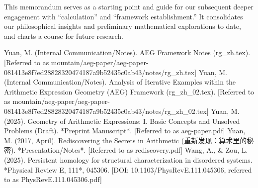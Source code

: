\documentclass[12pt]{article}
\begin{document}
This memorandum serves as a starting point and guide for our subsequent deeper engagement with ``calculation'' and ``framework establishment.'' It consolidates our philosophical insights and preliminary mathematical explorations to date, and charts a course for future research.

\begin{thebibliography}{9}
     Yuan, M. (Internal Communication/Notes). AEG Framework Notes (rg\_zh.tex). [Referred to as mountain/aeg-paper/aeg-paper-081413e8f7ed28828320474187a9b52435c0ab43/notes/rg\_zh.tex]
     Yuan, M. (Internal Communication/Notes). Analysis of Iterative Examples within the Arithmetic Expression Geometry (AEG) Framework (rg\_zh\_02.tex). [Referred to as mountain/aeg-paper/aeg-paper-081413e8f7ed28828320474187a9b52435c0ab43/notes/rg\_zh\_02.tex]
     Yuan, M. (2025). Geometry of Arithmetic Expressions: I. Basic Concepts and Unsolved Problems (Draft). *Preprint Manuscript*. [Referred to as aeg-paper.pdf]
     Yuan, M. (2017, April). Rediscovering the Secrets in Arithmetic (重新发现：算术里的秘密). *Presentation/Notes*. [Referred to as rediscovery.pdf]
     Wang, A., \& Zou, L. (2025). Persistent homology for structural characterization in disordered systems. *Physical Review E, 111*, 045306. [DOI: 10.1103/PhysRevE.111.045306, referred to as PhysRevE.111.045306.pdf]
\end{thebibliography}
\end{document}
